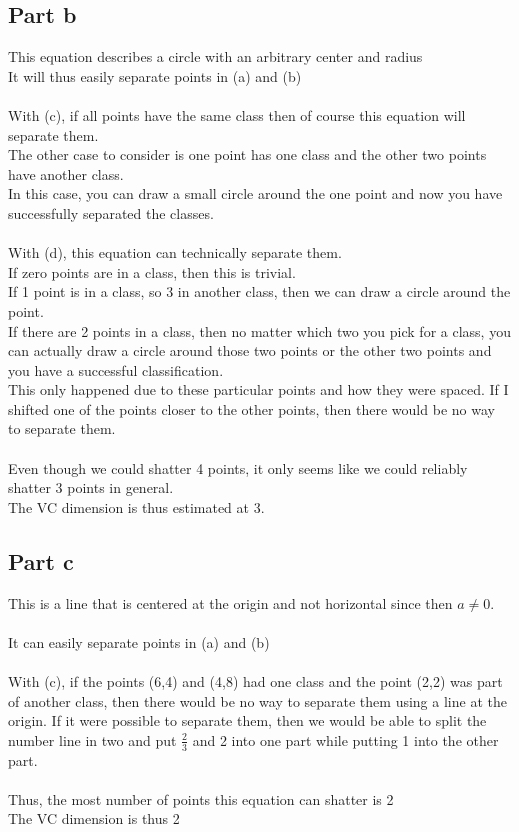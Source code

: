 \documentclass[twoside,11pt]{article}
\theoremstyle{definition}
\begin{document}
\subsection*{Part b}

This equation describes a circle with an arbitrary center and radius\\
It will thus easily separate points in (a) and (b)\\
\\
With (c), if all points have the same class then of course this equation will separate them. \\
The other case to consider is one point has one class and the other two points have another class. \\
In this case, you can draw a small circle around the one point and now you have successfully separated the classes.\\
\\
With (d), this equation can technically separate them.\\
If zero points are in a class, then this is trivial. \\
If 1 point is in a class, so 3 in another class, then we can draw a circle around the point.\\
If there are 2 points in a class, then no matter which two you pick for a class, you can actually draw a circle around those two points or the other two points and you have a successful classification. \\
This only happened due to these particular points and how they were spaced. If I shifted one of the points closer to the other points, then there would be no way to separate them. \\
\\
Even though we could shatter 4 points, it only seems like we could reliably shatter 3 points in general.\\
The VC dimension is thus estimated at 3.

\subsection*{Part c}

This is a line that is centered at the origin and not horizontal since then $a \neq 0$. \\
\\
It can easily separate points in (a) and (b)\\
\\
With (c), if the points (6,4) and (4,8) had one class and the point (2,2) was part of another class, then there would be no way to separate them using a line at the origin. If it were possible to separate them, then we would be able to split the number line in two and put $\frac{2}{3}$ and 2 into one part while putting 1 into the other part.\\
\\
Thus, the most number of points this equation can shatter is 2\\
The VC dimension is thus 2
\end{document}
